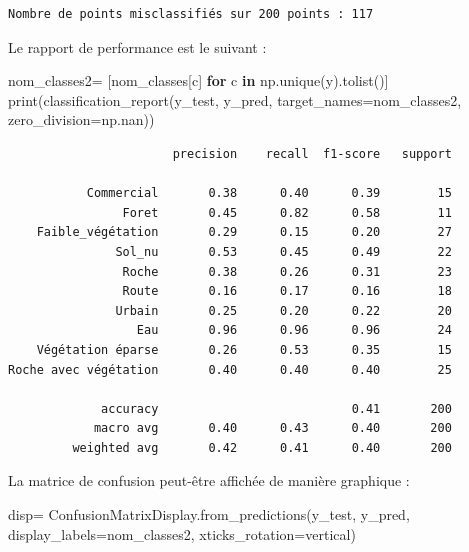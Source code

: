 \documentclass[
  french,
  11pt,
  letterpaper,
  open=any,
  twoside=false,
  french]{scrbook}
\newenvironment{Shaded}{\begin{snugshade}}{\end{snugshade}}
\newcommand{\BuiltInTok}[1]{\textcolor[rgb]{0.00,0.23,0.31}{#1}}
\newcommand{\ControlFlowTok}[1]{\textcolor[rgb]{0.00,0.23,0.31}{\textbf{#1}}}
\newcommand{\KeywordTok}[1]{\textcolor[rgb]{0.00,0.23,0.31}{\textbf{#1}}}
\newcommand{\NormalTok}[1]{\textcolor[rgb]{0.00,0.23,0.31}{#1}}
\newcommand{\OperatorTok}[1]{\textcolor[rgb]{0.37,0.37,0.37}{#1}}
\newcommand{\StringTok}[1]{\textcolor[rgb]{0.13,0.47,0.30}{#1}}
\begin{document}
\begin{verbatim}
Nombre de points misclassifiés sur 200 points : 117
\end{verbatim}

Le rapport de performance est le suivant :

\begin{Shaded}
\begin{Highlighting}[]
\NormalTok{nom\_classes2}\OperatorTok{=}\NormalTok{ [nom\_classes[c] }\ControlFlowTok{for}\NormalTok{ c }\KeywordTok{in}\NormalTok{ np.unique(y).tolist()]}
\BuiltInTok{print}\NormalTok{(classification\_report(y\_test, y\_pred, target\_names}\OperatorTok{=}\NormalTok{nom\_classes2, zero\_division}\OperatorTok{=}\NormalTok{np.nan))}
\end{Highlighting}
\end{Shaded}

\begin{verbatim}
                       precision    recall  f1-score   support

           Commercial       0.38      0.40      0.39        15
                Foret       0.45      0.82      0.58        11
    Faible_végétation       0.29      0.15      0.20        27
               Sol_nu       0.53      0.45      0.49        22
                Roche       0.38      0.26      0.31        23
                Route       0.16      0.17      0.16        18
               Urbain       0.25      0.20      0.22        20
                  Eau       0.96      0.96      0.96        24
    Végétation éparse       0.26      0.53      0.35        15
Roche avec végétation       0.40      0.40      0.40        25

             accuracy                           0.41       200
            macro avg       0.40      0.43      0.40       200
         weighted avg       0.42      0.41      0.40       200
\end{verbatim}

La matrice de confusion peut-être affichée de manière graphique :

\begin{Shaded}
\begin{Highlighting}[]
\NormalTok{disp}\OperatorTok{=}\NormalTok{ ConfusionMatrixDisplay.from\_predictions(y\_test, y\_pred, display\_labels}\OperatorTok{=}\NormalTok{nom\_classes2, xticks\_rotation}\OperatorTok{=}\StringTok{\textquotesingle{}vertical\textquotesingle{}}\NormalTok{)}
\end{Highlighting}
\end{Shaded}
\end{document}
